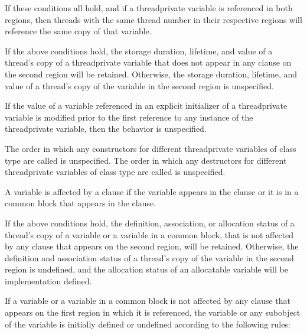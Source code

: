 If these conditions all hold, and if a threadprivate variable is referenced in both regions, 
then threads with the same thread number in their respective regions will reference the 
same copy of that variable.

\ccppspecificstart
If the above conditions hold, the storage duration, lifetime, and value of a thread’s copy 
of a threadprivate variable that does not appear in any  clause on the second 
region will be retained. Otherwise, the storage duration, lifetime, and value of a thread’s 
copy of the variable in the second region is unspecified.

If the value of a variable referenced in an explicit initializer of a threadprivate variable 
is modified prior to the first reference to any instance of the threadprivate variable, then 
the behavior is unspecified. 
\ccppspecificend

\cppspecificstart
The order in which any constructors for different threadprivate variables of class type 
are called is unspecified. The order in which any destructors for different threadprivate 
variables of class type are called is unspecified. 
\cppspecificend

\fortranspecificstart
A variable is affected by a  clause if the variable appears in the  clause 
or it is in a common block that appears in the  clause. 

If the above conditions hold, the definition, association, or allocation status of a thread’s 
copy of a  variable or a variable in a  common 
block, that is not affected by any  clause that appears on the second region, will 
be retained. Otherwise, the definition and association status of a thread’s copy of the 
variable in the second region is undefined, and the allocation status of an allocatable 
variable will be implementation defined. 

If a  variable or a variable in a  common block is 
not affected by any  clause that appears on the first  region in which 
it is referenced, the variable or any subobject of the variable is initially defined or 
undefined according to the following rules:

